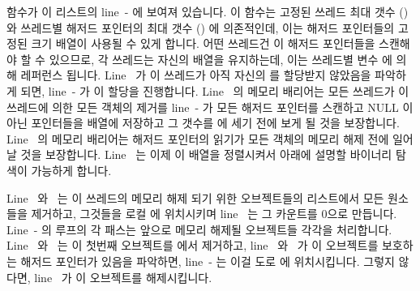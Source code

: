 \begin{lineref}
 함수가 이 리스트의 line~- 에 보여져
있습니다.
이 함수는 고정된 쓰레드 최대 갯수 () 와 쓰레드별 해저드 포인터의
최대 갯수 () 에 의존적인데, 이는 해저드 포인터들의 고정된 크기 배열이
사용될 수 있게 합니다.
어떤 쓰레드건 이 해저드 포인터들을 스캔해야 할 수 있으므로, 각 쓰레드는 자신의
배열을 유지하는데, 이는 쓰레드별 변수  에 의해 레퍼런스 됩니다.
Line~ 가 이 쓰레드가 아직 자신의  를 할당받지 않았음을
파악하게 되면, line~- 가 이 할당을 진행합니다.
Line~ 의 메모리 배리어는 모든 쓰레드가 이 쓰레드에 의한 모든 객체의
제거를 line~- 가 모든 해저드 포인터를 스캔하고 NULL
이 아닌 포인터들을  배열에 저장하고 그 갯수를  에 세기 전에
보게 될 것을 보장합니다.
Line~ 의 메모리 배리어는 해저드 포인터의 읽기가 모든 객체의 메모리
해제 전에 일어날 것을 보장합니다.
Line~ 는 이제 이 배열을 정렬시켜서 아래에 설명할 바이너리 탐색이
가능하게 합니다.

Line~ 와~ 는 이 쓰레드의 메모리 해제 되기 위한
오브젝트들의 리스트에서 모든 원소들을 제거하고, 그것들을 로컬  에
위치시키며 line~ 는 그 카운트를 0으로 만듭니다.
Line~- 의 루프의 각 패스는 앞으로 메모리 해제될
오브젝트들 각각을 처리합니다.
Line~ 와~ 는 이 첫번째 오브젝트를 
에서 제거하고, line~ 와~ 가 이 오브젝트를
보호하는 해저드 포인터가 있음을 파악하면, line~- 는
이걸 도로  에 위치시킵니다.
그렇지 않다면, line~ 가 이 오브젝트를 해제시킵니다.
\iffalse


\end{lineref}
